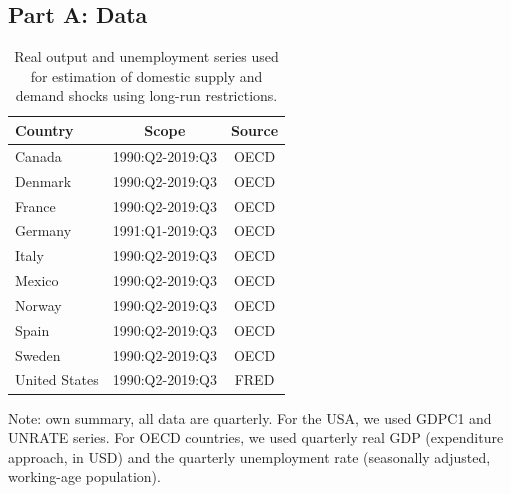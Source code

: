 \documentclass[12pt, a4paper]{article}
\begin{document}
\subsection*{Part A: Data} \label{appendix:a}
\begin{table}[H]
\captionsetup{justification=raggedright, singlelinecheck=false}
    \centering
    \caption{Real output and unemployment series used for estimation of domestic supply and demand shocks using long-run restrictions.}
    \begin{tabular}{lcc}
    \toprule
       Country & Scope & Source  \\
    \midrule
       Canada  & 1990:Q2-2019:Q3 & OECD \\
       Denmark & 1990:Q2-2019:Q3 & OECD \\
       France  & 1990:Q2-2019:Q3 & OECD \\
       Germany & 1991:Q1-2019:Q3 & OECD \\
       Italy   & 1990:Q2-2019:Q3 & OECD \\
       Mexico  & 1990:Q2-2019:Q3 & OECD \\
       Norway  & 1990:Q2-2019:Q3 & OECD \\
       Spain   & 1990:Q2-2019:Q3 & OECD \\
       Sweden  & 1990:Q2-2019:Q3 & OECD \\
       United States & 1990:Q2-2019:Q3 & FRED \\
    \bottomrule 
    \end{tabular}
    \begin{minipage}{\textwidth}
    \vspace{0.1cm}
    \footnotesize Note: own summary, all data are quarterly. For the USA, we used GDPC1 and UNRATE series. For OECD countries, we used quarterly real GDP (expenditure approach, in USD) and the quarterly unemployment rate (seasonally adjusted, working-age population).
    \end{minipage}
    \label{table:a1}
\end{table}


\end{document}
